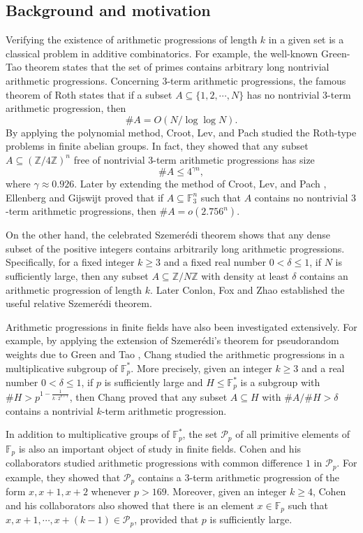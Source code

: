 \documentclass[12pt]{amsart}
\theoremstyle{plain}
\theoremstyle{remark}
\begin{document}
	\subsection{Background and motivation}
	Verifying the existence of arithmetic progressions of length $k$ in a given set is a classical problem in additive combinatorics. For example, the well-known Green-Tao theorem \cite{GT} states that the set of primes contains arbitrary long nontrivial arithmetic progressions. Concerning $3$-term arithmetic progressions, the famous theorem of Roth \cite{Roth} states that if a subset $A\subseteq\{1,2,\cdots, N\}$ has no nontrivial $3$-term arithmetic progression, then 
	$$\#A=O(N/\log\log N).$$
	 By applying the polynomial method, Croot, Lev, and Pach \cite{CLP} studied the Roth-type problems in finite abelian groups. In fact, they showed that any subset $A\subseteq \left(\mathbb{Z}/4\mathbb{Z}\right)^n$ free of nontrivial $3$-term arithmetic progressions has size 
	$$\#A\le 4^{\gamma n},$$
	where $\gamma\approx0.926$. Later by extending the method of Croot, Lev, and Pach \cite{CLP}, Ellenberg and Gĳswĳt \cite{EG} proved that if $A\subseteq\mathbb{F}_3^n$ such that $A$ contains no nontrivial $3$-term arithmetic progressions, then $\#A=o(2.756^n)$. 
	
	On the other hand, the celebrated Szemer\'edi theorem \cite{Sze} shows that any dense subset of the positive integers contains arbitrarily long arithmetic progressions. Specifically, for a fixed integer $k\ge3$ and a fixed real number $0<\delta\le 1$, if $N$ is sufficiently large, then any subset $A\subseteq \mathbb{Z}/N\mathbb{Z}$ with density at least $\delta$ contains an arithmetic progression of length $k$. Later Conlon, Fox and Zhao \cite{CFZ} established the useful relative Szemer\'edi theorem. 
	
	Arithmetic progressions in finite fields have also been investigated extensively. For example, by applying the extension of Szemer\'edi’s theorem for pseudorandom weights due to Green and Tao \cite{GT}, Chang \cite{Chang} studied the arithmetic progressions in a multiplicative subgroup of $\mathbb{F}_p^*$. More precisely, given an integer $k\ge3$ and a real number $0<\delta\le 1$, if $p$ is sufficiently large and $H\le \mathbb{F}_p^*$ is a subgroup with $\#H>p^{1-\frac{1}{k\cdot 2^{k+1}}}$, then Chang \cite[Theorem 1]{Chang} proved that any subset $A\subseteq H$ with $\#A/\#H>\delta$ contains a nontrivial $k$-term arithmetic progression. 
	
	In addition to multiplicative groups of $\mathbb{F}_p^*$, the set $\mathcal{P}_p$ of all primitive elements of $\mathbb{F}_p$ is also an important object of study in finite fields. Cohen and his collaborators \cite{Cohen15} studied arithmetic progressions with common difference $1$ in $\mathcal{P}_p$. For example, they \cite[Theorem 1.1]{Cohen15} showed that $\mathcal{P}_p$ contains a $3$-term arithmetic progression of the form $x,x+1,x+2$ whenever $p>169$. Moreover, given an integer $k\ge4$, Cohen and his collaborators \cite[Theorem 2]{Cohen15} also showed that there is an element $x\in\mathbb{F}_p$ such that $x,x+1,\cdots,x+(k-1)\in\mathcal{P}_p$, provided that $p$ is sufficiently large. 
	
\end{document}
